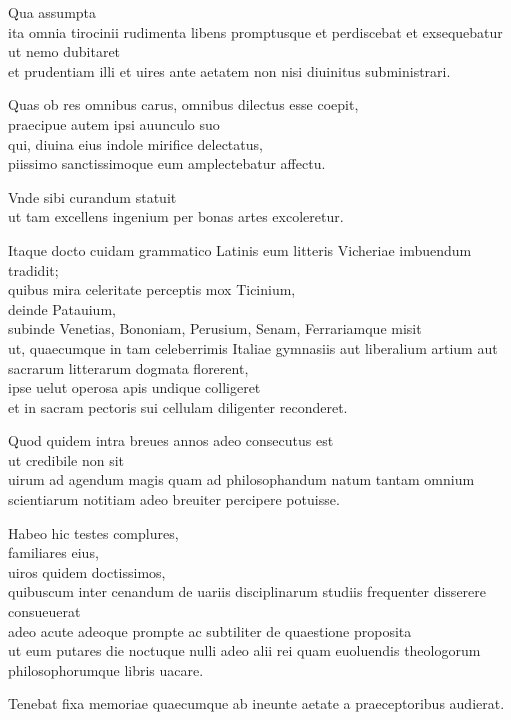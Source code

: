 \documentclass[a5paper,twoside]{article}
\begin{document}
Qua assumpta \\
ita omnia tirocinii rudimenta libens promptusque et perdiscebat et exsequebatur \\
ut nemo dubitaret \\
et prudentiam illi et uires ante aetatem non nisi diuinitus subministrari. 

Quas ob res omnibus carus, omnibus dilectus esse coepit, \\
praecipue autem ipsi auunculo suo \\
qui, diuina eius indole mirifice delectatus, \\
piissimo sanctissimoque eum amplectebatur affectu. 

Vnde sibi curandum statuit \\
ut tam excellens ingenium per bonas artes excoleretur. 

Itaque docto cuidam grammatico Latinis eum litteris Vicheriae imbuendum tradidit; \\
quibus mira celeritate perceptis mox Ticinium, \\
deinde Patauium, \\
subinde Venetias, Bononiam, Perusium, Senam, Ferrariamque misit \\
ut, quaecumque in tam celeberrimis Italiae gymnasiis aut liberalium artium aut sacrarum litterarum dogmata florerent, \\
ipse uelut operosa apis undique colligeret \\
et in sacram pectoris sui cellulam diligenter reconderet. 

Quod quidem intra breues annos adeo consecutus est \\
ut credibile non sit \\
uirum ad agendum magis quam ad philosophandum natum tantam omnium scientiarum notitiam adeo breuiter percipere potuisse. 

Habeo hic testes complures, \\
familiares eius, \\
uiros quidem doctissimos, \\
quibuscum inter cenandum de uariis disciplinarum studiis frequenter disserere consueuerat \\
adeo acute adeoque prompte ac subtiliter de quaestione proposita \\
ut eum putares die noctuque nulli adeo alii rei quam euoluendis theologorum philosophorumque libris uacare. 

Tenebat fixa memoriae quaecumque ab ineunte aetate a praeceptoribus audierat. 
\end{document}
